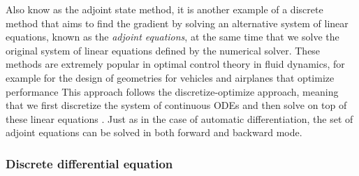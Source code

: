 Also know as the adjoint state method, it is another example of a discrete method that aims to find the gradient by solving an alternative system of linear equations, known as the \textit{adjoint equations}, at the same time that we solve the original system of linear equations defined by the numerical solver. 
These methods are extremely popular in optimal control theory in fluid dynamics, for example for the design of geometries for vehicles and airplanes that optimize performance \cite{Elliott_Peraire_1996, Giles_Pierce_2000}
This approach follows the discretize-optimize approach, meaning that we first discretize the system of continuous ODEs and then solve on top of these linear equations \cite{Giles_Pierce_2000}. 
Just as in the case of automatic differentiation, the set of adjoint equations can be solved in both forward and backward mode. 

\subsubsection{Discrete differential equation}

